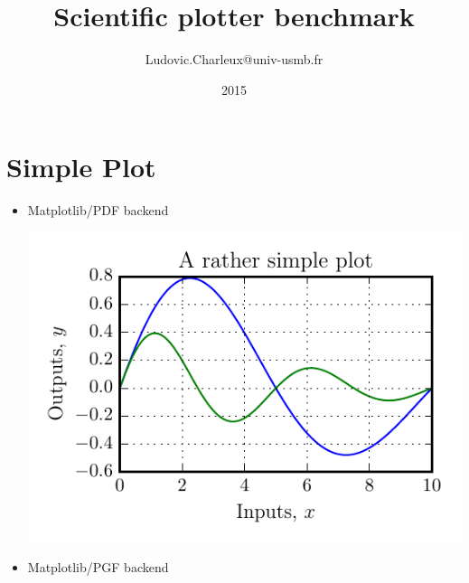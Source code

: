 \documentclass[12pt,a4paper,oneside,onecolumn]{article}
\author{Ludovic.Charleux@univ-usmb.fr}
\title{Scientific plotter benchmark}
\date{2015}
\begin{document}
\maketitle

\section{Simple Plot}

\begin{itemize}
\item Matplotlib/PDF backend

\includegraphics{simple_plot/mpl.pdf}

\item Matplotlib/PGF backend



\end{itemize}
\end{document}
